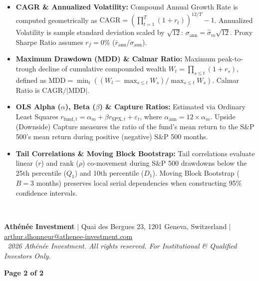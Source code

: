 \documentclass[10pt,a4paper]{article}
\begin{document}
\vspace{0.35em}

\begin{tcolorbox}[colback=cardbg, colframe=cardborder, title=\textbf{\small\strut Appendix B: Quantitative Framework \& Indicator Definitions}, fonttitle=\sffamily\bfseries\small\color{primary}, arc=5pt, boxrule=0.8pt, toptitle=3.5pt, bottomtitle=3.5pt, left=6pt, right=6pt, top=3.5pt, bottom=3.5pt, colbacktitle=cardborder]
\scriptsize
\begin{itemize}[leftmargin=1.2em, itemsep=1.2pt, topsep=1pt]
    \item \textbf{CAGR \& Annualized Volatility:} Compound Annual Growth Rate is computed geometrically as $\text{CAGR} = \left(\prod_{t=1}^T (1 + r_t)\right)^{12/T} - 1$. Annualized Volatility is sample standard deviation scaled by $\sqrt{12}$: $\sigma_{\text{ann}} = \hat{\sigma}_m \sqrt{12}$. Proxy Sharpe Ratio assumes $r_f = 0\%$ ($\bar{r}_{\text{ann}} / \sigma_{\text{ann}}$).
    \item \textbf{Maximum Drawdown (MDD) \& Calmar Ratio:} Maximum peak-to-trough decline of cumulative compounded wealth $W_t = \prod_{s \le t}(1+r_s)$, defined as $\text{MDD} = \min_t \left((W_t - \max_{s \le t} W_s) / \max_{s \le t} W_s\right)$. Calmar Ratio is $\text{CAGR} / |\text{MDD}|$.
    \item \textbf{OLS Alpha ($\alpha$), Beta ($\beta$) \& Capture Ratios:} Estimated via Ordinary Least Squares $r_{\text{fund},t} = \alpha_m + \beta r_{\text{SPX},t} + \varepsilon_t$, where $\alpha_{\text{ann}} = 12 \times \alpha_m$. Upside (Downside) Capture measures the ratio of the fund's mean return to the S\&P 500's mean return during positive (negative) S\&P 500 months.
    \item \textbf{Tail Correlations \& Moving Block Bootstrap:} Tail correlations evaluate linear ($r$) and rank ($\rho$) co-movement during S\&P 500 drawdowns below the 25th percentile ($Q_1$) and 10th percentile ($D_1$). Moving Block Bootstrap ($B=3$ months) preserves local serial dependencies when constructing 95\% confidence intervals.
\end{itemize}
\end{tcolorbox}

\vfill

\noindent{\color{cardborder}\rule{\textwidth}{0.6pt}}\\[2pt]
\noindent
\begin{minipage}[c]{0.74\textwidth}
    {\tiny \textcolor{mutedtext}{\textbf{Ath\'en\'ee Investment} $\vert$ Quai des Bergues 23, 1201 Geneva, Switzerland $\vert$ \href{mailto:arthur.dhonneur@athenee-investment.com}{arthur.dhonneur@athenee-investment.com}}\\[1pt]
    \tiny \textcolor{mutedtext}{\textit{\textcopyright\ 2026 Ath\'en\'ee Investment. All rights reserved. For Institutional \& Qualified Investors Only.}}}
\end{minipage}%
\hfill
\begin{minipage}[c]{0.24\textwidth}
    \raggedleft
    {\tiny \bfseries \textcolor{primary}{Page 2 of 2}}
\end{minipage}
\end{document}
